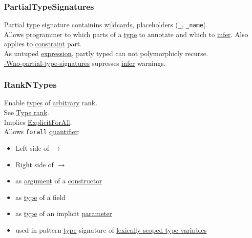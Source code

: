 \documentclass[a4paper,14pt,oneside]{book}
\begin{document}
{\subsubsection{\label{orge79988c}PartialTypeSignatures}
\label{sec:orgd0fbb08}
Partial \hyperref[orga9ca243]{type} signature containins \hyperref[orgbaf1b8d]{wildcards}, placeholders (\texttt{\_}, \texttt{\_name}).\\
Allows programmer to which parts of a \hyperref[orga9ca243]{type} to annotate and which to \hyperref[org49dbc3c]{infer}. Also applies to \hyperref[org5637118]{constraint} part.\\

As untuped \hyperref[org4f4ad69]{expression}, partly typed can not polymorphicly recurse.\\

\hyperref[orgc5a56e9]{-Wno-partial-type-signatures} supresses \hyperref[org49dbc3c]{infer} warnings.\\

\subsubsection{\label{orgb5f940f}RankNTypes}
\label{sec:org57c1a75}
Enable \hyperref[org51532d9]{types} of \hyperref[org4a2927f]{arbitrary} rank.\\
See \hyperref[org207c9cd]{Type rank}.\\

Implies \hyperref[org4aa70b2]{ExplicitForAll}.\\

Allows \texttt{forall} \hyperref[org965fc88]{quantifier}:\\
\begin{itemize}
\item Left side of \(\to\)\\
\item Right side of \(\to\)\\
\item as \hyperref[orgdd12744]{argument} of a \hyperref[org7a94df0]{constructor}\\
\item as \hyperref[orga9ca243]{type} of a field\\
\item as \hyperref[orga9ca243]{type} of an implicit \hyperref[org0db8baa]{parameter}\\
\item used in pattern \hyperref[orga9ca243]{type} signature of \hyperref[org891fc64]{lexically scoped type variables}\\
\end{itemize}

}
\end{document}
